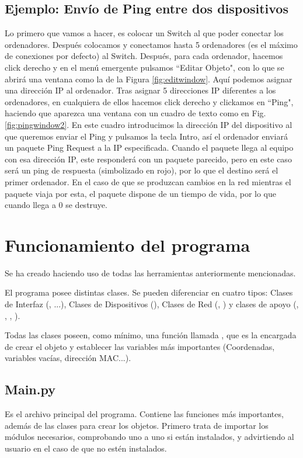 \documentclass[a4paper, 11pt]{report} %
\begin{document}
\subsection{Ejemplo: Envío de Ping entre dos dispositivos}
Lo primero que vamos a hacer, es colocar un Switch al que poder conectar los ordenadores. Después colocamos y conectamos hasta 5 ordenadores (es el máximo de conexiones por defecto) al Switch. Después, para cada ordenador, hacemos click derecho y en el menú emergente pulsamos ``Editar Objeto", con lo que se abrirá una ventana como la de la Figura \ref{fig:editwindow}. Aquí podemos asignar una dirección IP al ordenador. Tras asignar 5 direcciones IP diferentes a los ordenadores, en cualquiera de ellos hacemos click derecho y clickamos en ``Ping", haciendo que aparezca una ventana con un cuadro de texto como en Fig. \ref{fig:pingwindow2}. En este cuadro introducimos la dirección IP del dispositivo al que queremos enviar el Ping y pulsamos la tecla Intro, así el ordenador enviará un paquete Ping Request a la IP especificada. Cuando el paquete llega al equipo con esa dirección IP, este responderá con un paquete parecido, pero en este caso será un ping de respuesta (simbolizado en rojo), por lo que el destino será el primer ordenador. En el caso de que se produzcan cambios en la red mientras el paquete viaja por esta, el paquete dispone de un tiempo de vida, por lo que cuando llega a 0 se destruye.

\newpage
\section{Funcionamiento del programa}
Se ha creado haciendo uso de todas las herramientas anteriormente mencionadas.

El programa posee distintas clases. Se pueden diferenciar en cuatro tipos: Clases de Interfaz (, ...), 
Clases de Dispositivos (), Clases de Red (, ) y clases de apoyo (, , , ).

Todas las clases poseen, como mínimo, una función llamada , que es la encargada de crear el objeto y establecer las variables más importantes (Coordenadas, variables vacías, dirección MAC...).

\subsection{Main.py}
Es el archivo principal del programa. Contiene las funciones más importantes, además de las clases para crear los objetos. Primero trata de importar los módulos necesarios, comprobando uno a uno si están instalados, y advirtiendo al usuario en el caso de que no estén instalados.
\end{document}
